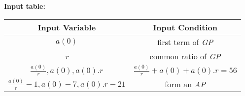 \documentclass{article}
\begin{document}
\textbf{Input table:}\\
\begin{center}
\begin{tabular}{|c|c|}
  \hline
    Input Variable & Input Condition \\
\hline
    $a(0)$ & first term of \textit{GP} \\
\hline
    \textit{r} & common ratio of \textit{GP}\\
\hline
    $\frac{a(0)}{r},a(0),a(0).r$ & $\frac{a(0)}{r}+a(0)+a(0).r=56$ \\
\hline
    $\frac{a(0)}{r}-1,a(0)-7,a(0).r-21$ & form an \textit{AP}\\
\hline
\end{tabular}
\end{center}
\end{document}
